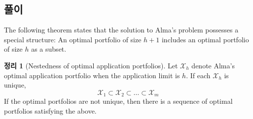 \documentclass[12pt]{article} %
\newif\ifEN
\newtheorem{theorem}{Theorem}
\theoremstyle{definition}
\newtheorem{theorem}{정리}
\theoremstyle{definition}
\begin{document}
\ifEN \subsection{Solution}  \else \subsection{풀이} \fi
The following theorem states that the solution to Alma's problem possesses a special structure: An optimal portfolio of size $h+1$ includes an optimal portfolio of size $h$ as a subset. 
\begin{theorem}[Nestedness of optimal application portfolios] \label{nestedapplication}
Let $\mathcal{X}_h$ denote Alma’s optimal application portfolio when the application limit is $h$. If each $\mathcal{X}_h$ is unique,
\begin{equation}
\mathcal{X}_1 \subset \mathcal{X}_2\subset \dots \subset \mathcal{X}_m
\end{equation}
If the optimal portfolios are not unique, then there is a sequence of optimal portfolios satisfying the above.
\end{theorem}
\end{document}
